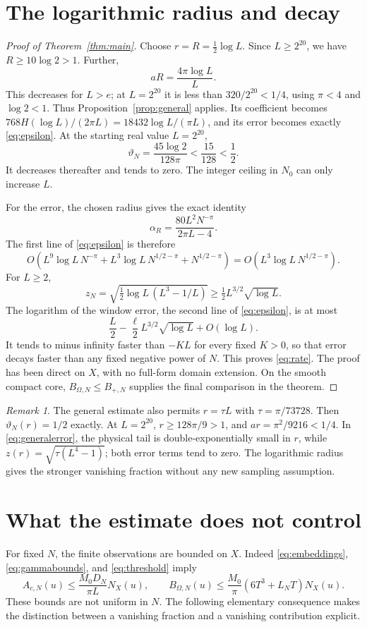 \documentclass[11pt]{article}
\theoremstyle{remark}\newtheorem{remark}[theorem]{Remark}
\newcommand{\NX}{N_X}
\numberwithin{equation}{section}
\begin{document}
\section{The logarithmic radius and decay}\label{sec:decay}
\begin{proof}[Proof of Theorem~\ref{thm:main}]
Choose $r=R=\tfrac12\log L$. Since $L\ge2^{20}$, we have $R\ge10\log2>1$. Further,
\[
 aR=\frac{4\pi\log L}{L}.
\]
This decreases for $L>e$; at $L=2^{20}$ it is less than $320/2^{20}<1/4$, using $\pi<4$ and $\log2<1$. Thus Proposition~\ref{prop:general} applies. Its coefficient becomes
$768H(\log L)/(2\pi L)=18432\log L/(\pi L)$, and its error becomes exactly \eqref{eq:epsilon}.
At the starting real value $L=2^{20}$,
\[
 \vartheta_N=\frac{45\log2}{128\pi}<\frac{15}{128}<\frac12.
\]
It decreases thereafter and tends to zero. The integer ceiling in $N_0$ can only increase $L$.

For the error, the chosen radius gives the exact identity
\begin{equation}\label{eq:alphaexact}
 \alpha_R=\frac{80L^2N^{-\pi}}{2\pi L-4}.
\end{equation}
The first line of \eqref{eq:epsilon} is therefore
\[
 O\!\left(L^9\log L\,N^{-\pi}
       +L^3\log L\,N^{1/2-\pi}+N^{1/2-\pi}\right)
 =O\!\left(L^3\log L\,N^{1/2-\pi}\right).
\]
For $L\ge2$,
\[
 z_N=\sqrt{\tfrac12\log L\,(L^3-1/L)}
 \ge\tfrac12L^{3/2}\sqrt{\log L}.
\]
The logarithm of the window error, the second line of \eqref{eq:epsilon}, is at most
\[
 \frac L2-\frac{\ell}{2}L^{3/2}\sqrt{\log L}+O(\log L).
\]
It tends to minus infinity faster than $-KL$ for every fixed $K>0$, so that error decays faster than any fixed negative power of $N$. This proves \eqref{eq:rate}. The proof has been direct on $X$, with no full-form domain extension. On the smooth compact core, $B_{\Omega,N}\le B_{+,N}$ supplies the final comparison in the theorem.
\end{proof}

\begin{remark}\label{rem:linearradius}
The general estimate also permits $r=\tau L$ with $\tau=\pi/73728$. Then $\vartheta_N(r)=1/2$ exactly. At $L=2^{20}$, $r\ge128\pi/9>1$, and $ar=\pi^2/9216<1/4$. In \eqref{eq:generalerror}, the physical tail is double-exponentially small in $r$, while $z(r)=\sqrt{\tau(L^4-1)}$; both error terms tend to zero. The logarithmic radius gives the stronger vanishing fraction without any new sampling assumption.
\end{remark}

\section{What the estimate does not control}\label{sec:scope}
For fixed $N$, the finite observations are bounded on $X$. Indeed \eqref{eq:embeddings}, \eqref{eq:gammabounds}, and \eqref{eq:threshold} imply
\begin{equation}\label{eq:boundedobs}
 A_{c,N}(u)\le\frac{M_0D_N}{\pi L}\NX(u),\qquad
 B_{\Omega,N}(u)\le\frac{M_0}{\pi}(6T^3+L_NT)\NX(u).
\end{equation}
These bounds are not uniform in $N$. The following elementary consequence makes the distinction between a vanishing fraction and a vanishing contribution explicit.
\end{document}

